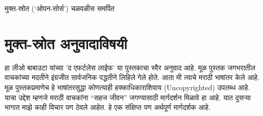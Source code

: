 \begin{dedication}
मुक्त-स्रोत (`ओपन-सोर्स') चळवळीस  समर्पित  
\end{dedication}

\clearpage

\chapter*{मुक्त-स्रोत अनुवादाविषयी}
हा लीओ बाबाउटा यांच्या 'द एफर्टलेस लाईफ' या पुस्तकाचा स्वैर अनुवाद आहे.  मूळ पुस्तक जगभरातील वाचकांच्या मदतीने इंग्रजीत सार्वजनिक पद्धतीने लिहिले गेले होते.  आता मी त्याचे मराठी भाषांतर केले आहे.   मूळ पुस्तकप्रमाणेच  हे भाषांतरसुद्धा  कोणत्याही हक्काधिकाराशिवाय (Uncopyrighted) उपलब्ध आहे.  याचा उद्देश म्हणजे मराठी वाचकांना ``सहज जीवन'' जगण्यासाठी मार्गदर्शन मिळावे हा आहे. यात दुसऱ्या भागात माझे काही विचार पण ठेवले आहेत.  हे एक संक्षिप्त पण अर्थपूर्ण मार्गदर्शक आहे.

